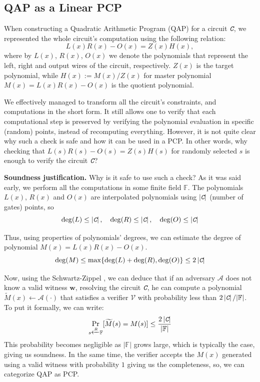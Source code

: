 \documentclass[../lecture-notes.tex]{subfiles}
\begin{document}
\subsection{QAP as a Linear PCP}

When constructing a Quadratic Arithmetic Program (QAP) for a circuit $\textit{\texttt{C}}$, we represented the whole circuit's 
computation using the following relation:
\begin{equation*}
    L(x)R(x) - O(x) = Z(x)H(x),
\end{equation*}
where by $L(x)$, $R(x)$, $O(x)$ we denote the polynomials that represent the left, right and output 
wires of the circuit, respectively. $Z(x)$ is the target polynomial, while
$H(x) := M(x)\big/Z(x)$ for master polynomial $M(x) = L(x)R(x) - O(x)$ is the quotient polynomial.

We effectively managed to transform all the circuit's constraints, and computations in the short form.
It still allows one to verify that each computational step is preserved by verifying the 
polynomial evaluation in specific (random) points, instead of recomputing everything. However, it is 
not quite clear why such a check is safe and how it can be used in a PCP. In other words, why checking that $L(s)R(s)-O(s)=Z(s)H(s)$ for randomly selected $s$ is enough to verify the circuit $\textit{\texttt{C}}$?

\textbf{Soundness justification.} Why is it safe to use such a check? As it was said early, 
we perform all the computations in some finite field $\mathbb{F}$. The 
polynomials $L(x)$, $R(x)$ and $O(x)$ are interpolated polynomials using $\left| \textit{\texttt{C}} \right|$ (number of gates) points, so 
\begin{equation*}
    \deg(L) \le \left| \textit{\texttt{C}} \right|, \quad 
    \deg(R) \le \left| \textit{\texttt{C}} \right|, \quad 
    \deg(O) \le \left| \textit{\texttt{C}} \right|
\end{equation*}

Thus, using properties of polynomials' degrees, we can estimate the degree of polynomial $M(x) = L(x)R(x) - O(x)$.
\begin{equation*}
    \deg(M) \leq \max\{\deg(L) + \deg(R), \deg(O)\} \leq 2 \left| \textit{\texttt{C}} \right|
\end{equation*}

Now, using the Schwartz-Zippel ,
we can deduce that if an adversary $\mathcal{A}$ does not know a valid witness $\mathbf{w}$, 
resolving the circuit $\textit{\texttt{C}}$, he can compute a polynomial $\widetilde{M}(x) \gets \mathcal{A}(\cdot)$ that 
satisfies a verifier $\mathcal{V}$ with probability less than $2 \left| \textit{\texttt{C}} \right|/|\mathbb{F}|$. To put it formally, we can write:
\begin{equation*}
    \mathop{\text{Pr}}_{s \xleftarrow{R} \mathbb{F}}[\widetilde{M}(s) = M(s)] \leq \frac{2 \left| \textit{\texttt{C}} \right|}{|\mathbb{F}|}
\end{equation*}
This probability becomes negligible as $|\mathbb{F}|$ grows large, which is typically the case, giving us soundness. In the same time, the
verifier accepts the $M(x)$ generated using a valid witness with probability $1$ giving us the 
completeness, so, we can categorize QAP as PCP. 
\end{document}
